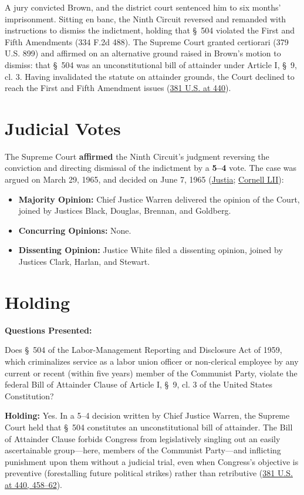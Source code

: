 \documentclass[12pt]{article}
\begin{document}
A jury convicted Brown, and the district court sentenced him to six months' imprisonment. Sitting en banc, the Ninth Circuit reversed and remanded with instructions to dismiss the indictment, holding that \S~504 violated the First and Fifth Amendments (334 F.2d 488). The Supreme Court granted certiorari (379 U.S. 899) and affirmed on an alternative ground raised in Brown's motion to dismiss: that \S~504 was an unconstitutional bill of attainder under Article I, \S~9, cl. 3. Having invalidated the statute on attainder grounds, the Court declined to reach the First and Fifth Amendment issues (\href{https://www.law.cornell.edu/supremecourt/text/381/437}{381 U.S. at 440}).

\section{Judicial Votes}
The Supreme Court \textbf{affirmed} the Ninth Circuit's judgment reversing the conviction and directing dismissal of the indictment by a \textbf{5--4} vote. The case was argued on March 29, 1965, and decided on June 7, 1965 (\href{https://supreme.justia.com/cases/federal/us/381/437/}{Justia}; \href{https://www.law.cornell.edu/supremecourt/text/381/437}{Cornell LII}):

\begin{itemize}
    \item \textbf{Majority Opinion:} Chief Justice Warren delivered the opinion of the Court, joined by Justices Black, Douglas, Brennan, and Goldberg.
    \item \textbf{Concurring Opinions:} None.
    \item \textbf{Dissenting Opinion:} Justice White filed a dissenting opinion, joined by Justices Clark, Harlan, and Stewart.
\end{itemize}

\section{Holding}
\textbf{Questions Presented:}

Does \S~504 of the Labor-Management Reporting and Disclosure Act of 1959, which criminalizes service as a labor union officer or non-clerical employee by any current or recent (within five years) member of the Communist Party, violate the federal Bill of Attainder Clause of Article I, \S~9, cl. 3 of the United States Constitution?

\textbf{Holding:} Yes. In a 5--4 decision written by Chief Justice Warren, the Supreme Court held that \S~504 constitutes an unconstitutional bill of attainder. The Bill of Attainder Clause forbids Congress from legislatively singling out an easily ascertainable group---here, members of the Communist Party---and inflicting punishment upon them without a judicial trial, even when Congress's objective is preventive (forestalling future political strikes) rather than retributive (\href{https://supreme.justia.com/cases/federal/us/381/437/}{381 U.S. at 440, 458--62}).
\end{document}
